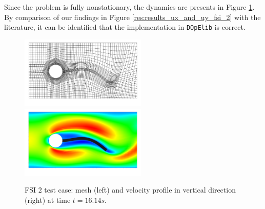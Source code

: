 \documentclass[prodmode,acmtoms]{acmsmall}
\numberwithin{equation}{section}
\newcommand{\dope}{\texttt{DOpElib}}
\begin{document}
Since the problem is fully nonstationary, the 
dynamics are presents in Figure \ref{res:fsi_2_mesh_and_x_velo}. 
By comparison of our findings in Figure \ref{res:results_ux_and_uy_fsi_2}
with the literature, it can be identified that 
the implementation in \dope{} is correct.



\begin{figure}[h]
\centering
{\includegraphics[width=6cm]{Pictures/visit_fsi_2_CNn_t_2e-2_global_3_biharmonic_mesh8070_scale.png}}
{\includegraphics[width=6cm]{Pictures/visit_fsi_2_CNn_t_2e-2_global_3_biharmonic_x_velo8070_scale.png}}
\caption{FSI 2 test case: mesh (left) and velocity profile in vertical 
direction (right) at time $t=16.14s$.}
\label{res:fsi_2_mesh_and_x_velo}
\end{figure}
\end{document}
